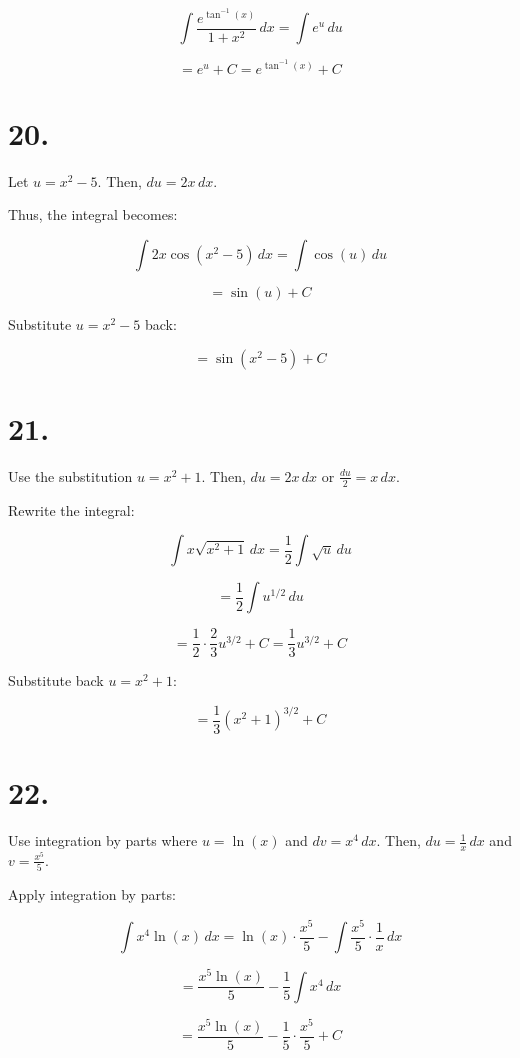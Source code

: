 \documentclass{article}
\begin{document}
\[
\int \frac{e^{\tan^{-1}(x)}}{1 + x^2} \, dx = \int e^u \, du
\]

\[
= e^u + C = e^{\tan^{-1}(x)} + C
\]



\section*{20.}

Let \( u = x^2 - 5 \). Then, \( du = 2x \, dx \).

Thus, the integral becomes:

\[
\int 2x \cos(x^2 - 5) \, dx = \int \cos(u) \, du
\]

\[
= \sin(u) + C
\]

Substitute \( u = x^2 - 5 \) back:

\[
= \sin(x^2 - 5) + C
\]

\section*{21.}

Use the substitution \( u = x^2 + 1 \). Then, \( du = 2x \, dx \) or \( \frac{du}{2} = x \, dx \).

Rewrite the integral:

\[
\int x \sqrt{x^2 + 1} \, dx = \frac{1}{2} \int \sqrt{u} \, du
\]

\[
= \frac{1}{2} \int u^{1/2} \, du
\]

\[
= \frac{1}{2} \cdot \frac{2}{3} u^{3/2} + C = \frac{1}{3} u^{3/2} + C
\]

Substitute back \( u = x^2 + 1 \):

\[
= \frac{1}{3} (x^2 + 1)^{3/2} + C
\]

\section*{22.}

Use integration by parts where \( u = \ln(x) \) and \( dv = x^4 \, dx \). Then, \( du = \frac{1}{x} \, dx \) and \( v = \frac{x^5}{5} \).

Apply integration by parts:

\[
\int x^4 \ln(x) \, dx = \ln(x) \cdot \frac{x^5}{5} - \int \frac{x^5}{5} \cdot \frac{1}{x} \, dx
\]

\[
= \frac{x^5 \ln(x)}{5} - \frac{1}{5} \int x^4 \, dx
\]

\[
= \frac{x^5 \ln(x)}{5} - \frac{1}{5} \cdot \frac{x^5}{5} + C
\]
\end{document}
